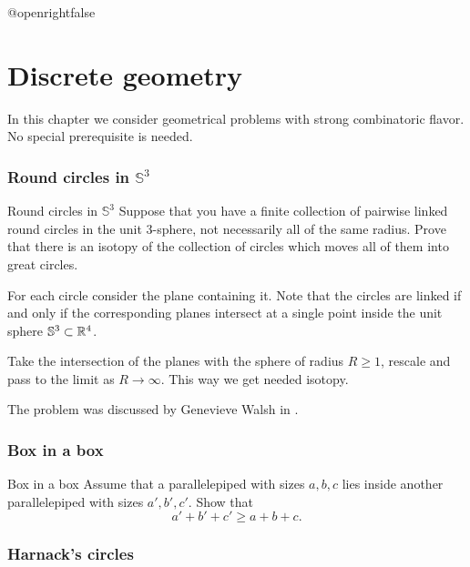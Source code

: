 \csname @openrightfalse\endcsname
\chapter{Discrete geometry}

In this chapter we consider geometrical problems with strong combinatoric flavor.
No special prerequisite is needed.

\subsection*{Round circles in $\mathbb{S}^3$}

\begin{pr}{\easy}{Round circles in $\mathbb{S}^3$}\label{Round circles}
Suppose that you have a finite collection of pairwise linked round circles in the unit 3-sphere, 
not necessarily all of the same radius. 
Prove that there is an isotopy of the collection of circles 
which moves all of them into great circles.
\end{pr}


For each circle consider the plane containing it.
Note that the circles are linked 
if and only if 
the corresponding planes intersect at a single point inside the unit sphere $\mathbb{S}^3\subset \mathbb{R}^4$.

Take the intersection of the planes with the sphere of radius $R\ge 1$,
rescale and pass to the limit as $R\to\infty$.  
This way we get needed isotopy.\qeds

The problem was discussed 
by Genevieve Walsh in \cite{walsh}.

\subsection*{Box in a box}

\begin{pr}{}{Box in a box}\label{box-in-box} 
Assume that a parallelepiped with sizes $a,b,c$ 
lies inside another parallelepiped with sizes $a',b',c'$. 
Show that 
\[a'+b'+c'\ge a+b+c.\]

\end{pr}

\subsection*{Harnack's circles}

